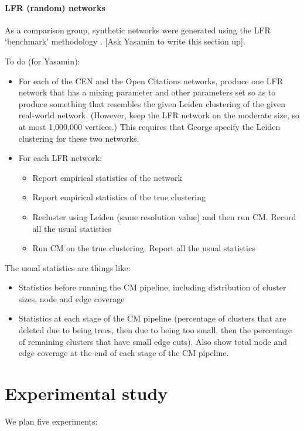 \documentclass[12pt, oneside]{article}   	%
\begin{document}
\paragraph{LFR (random) networks}
As a comparison group, synthetic networks were generated using the LFR `benchmark' methodology \citep{Lancichinetti2008}. [Ask Yasamin to write this section up].

To do (for Yasamin):

\begin{itemize}
\item For each of  the CEN and the Open Citations networks, produce one LFR network  that has a mixing parameter and other
parameters set so as to produce something that resembles the given Leiden clustering of the given real-world network. (However, keep the LFR network
on the moderate size, so at most 1,000,000 vertices.) This requires that George specify the Leiden clustering for these two networks.
\item 
For each LFR network: 
\begin{itemize}
\item Report empirical statistics of the network
\item Report empirical statistics of the true clustering 
\item 
Recluster using Leiden (same resolution value) and then run CM.
Record all the usual statistics
\item Run CM on the true clustering.
Report all the usual statistics
\end{itemize}
\end{itemize}

\noindent
The usual statistics are things like:
\begin{itemize}
\item Statistics before running the CM pipeline, including distribution of cluster sizes, node and edge coverage 
\item Statistics at each stage of the CM pipeline (percentage of clusters that are deleted due to being trees,
then due to being too small, then the percentage of remaining clusters  that have small edge cuts).
Also show total node and edge coverage at the end of each stage of the CM pipeline. 
\end{itemize}

\section{Experimental study}
We plan five experiments:
\end{document}
